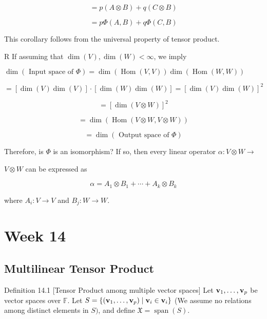 \documentclass[11pt]{article}
\begin{document}
\[
= p\left( {A \otimes  B}\right)  + q\left( {C \otimes  B}\right)
\]

\[
= {p\Phi }\left( {A,B}\right)  + {q\Phi }\left( {C,B}\right)
\]

This corollary follows from the universal property of tensor product.

R If assuming that \(\dim \left( V\right) ,\dim \left( W\right)  < \infty\), we imply

\(\dim \left( {\text{ Input space of }\Phi }\right)  = \dim \left( {\operatorname{Hom}\left( {V,V}\right) }\right) \dim \left( {\operatorname{Hom}\left( {W,W}\right) }\right)\)

\[
= \left\lbrack  {\dim \left( V\right) \dim \left( V\right) }\right\rbrack   \cdot  \left\lbrack  {\dim \left( W\right) \dim \left( W\right) }\right\rbrack   = {\left\lbrack  \dim \left( V\right) \dim \left( W\right) \right\rbrack  }^2
\]

\[
= {\left\lbrack  \dim \left( V \otimes  W\right) \right\rbrack  }^2
\]

\[
= \dim \left( {\operatorname{Hom}\left( {V \otimes  W,V \otimes  W}\right) }\right)
\]

\[
= \dim \left( {\text{ Output space of }\Phi }\right)
\]

Therefore, is \(\Phi\) is an isomorphism? If so, then every linear operator \(\alpha  : V \otimes  W \rightarrow\)

\(V \otimes  W\) can be expressed as

\[
\alpha  = {A}_1 \otimes  {B}_1 + \cdots  + {A}_{k} \otimes  {B}_{k}
\]

where \({A}_{i} : V \rightarrow  V\) and \({B}_{j} : W \rightarrow  W\).

\newpage
\section{Week 14}
\subsection{Multilinear Tensor Product}

Definition 14.1 [Tensor Product among multiple vector spaces] Let \({\bf v}_1,\ldots ,{\bf v}_{p}\) be vector spaces over \(\mathbb{F}\). Let \(S = \left\{  {\left( {{\bf v}_1,\ldots ,{\bf v}_{p}}\right)  \mid  {\bf v}_{i} \in  {\bf v}_{i}}\right\}\) (We assume no relations among distinct elements in \(S)\), and define \(\mathfrak{X} = \operatorname{span}\left( S\right)\).
\end{document}
